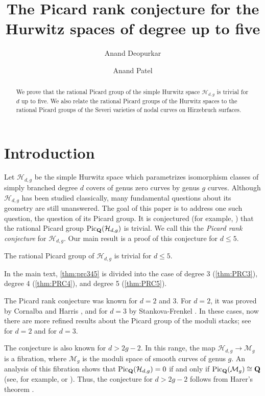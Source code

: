 \documentclass{article}
\title{The Picard rank conjecture for the Hurwitz spaces of degree up to five}
\author{Anand Deopurkar \and Anand Patel}
\providecommand {\Q}{{\bf Q}}
\providecommand{\Pic}{\operatorname{Pic}}
\renewcommand{\H}{\mathcal H}
\newcommand{\M}{\mathcal M}
\numberwithin{equation}{section}
\begin{document}
\maketitle
\begin{abstract}
  We prove that the rational Picard group of the simple Hurwitz space $\mathcal H_{d,g}$ is trivial for $d$ up to five. We also relate the rational Picard groups of the Hurwitz spaces to the rational Picard groups of the Severi varieties of nodal curves on Hirzebruch surfaces.
\end{abstract}

\section{Introduction}\label{sec:introduction}
Let $\H_{d,g}$ be the simple Hurwitz space which parametrizes isomorphism classes of simply branched degree $d$ covers of genus zero curves by genus $g$ curves. Although $\H_{d,g}$ has been studied classically, many fundamental questions about its geometry are still unanswered. The goal of this paper is to address one such question, the question of its Picard group. It is conjectured (for example, \cite{diaz96:_towar_homol_of_hurwit_spaces}) that the rational Picard group $\Pic_\Q(\H_{d,g})$ is trivial. We call this the \emph{Picard rank conjecture} for $\H_{d,g}$. Our main result is a proof of this conjecture for $d \leq 5$.
\begin{maintheorem}\label{thm:prc345}
  The rational Picard group of $\H_{d,g}$ is trivial for $d \leq 5$.
\end{maintheorem}
In the main text, \autoref{thm:prc345} is divided into the case of degree 3 (\autoref{thm:PRC3}), degree 4 (\autoref{thm:PRC4}),  and degree 5 (\autoref{thm:PRC5}).

The Picard rank conjecture was known for $d = 2$ and $3$. For $d = 2$, it was proved by Cornalba and Harris \cite[Lemma~4.5]{cornalba88:_divis}, and for $d = 3$ by Stankova-Frenkel \cite[\S~12.2]{Stankova-Frenkel00:_Modul_Of_Trigon_Curves}. In these cases, now there are more refined results about the Picard group of the moduli stacks; see \cite{cornalba:pic_hyper} for $d = 2$ and \cite{bolognesi12:_stack} for $d = 3$.

The conjecture is also known for $d > 2g-2$. In this range, the map $\H_{d,g} \to \M_g$ is a fibration, where $\M_g$ is the moduli space of smooth curves of genus $g$. An analysis of this fibration shows that $\Pic_\Q(\H_{d,g}) = 0$ if and only if $\Pic_\Q(\M_g) \cong \Q$ (see, for example, \cite{mochizuki95:_hurwit} or \cite[\S~3]{diaz96:_towar_homol_of_hurwit_spaces}). Thus, the conjecture for $d > 2g-2$ follows from Harer's theorem \cite{harer:Pic_Mg}.
\end{document}

